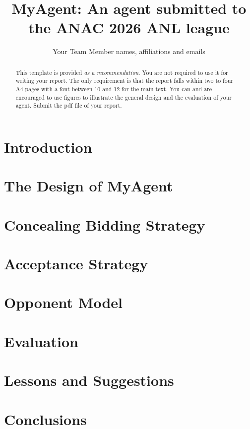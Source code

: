 \documentclass{article}
\title{MyAgent: An agent submitted to the ANAC 2026 ANL league}
\author{Your Team Member names, affiliations and emails}
\begin{document}
\maketitle
\begin{abstract}
	This template is provided \emph{as a recommendation}. You are not required
	to use it for writing your report. The only requirement is that the report
	falls within two to four A4 pages with a font between 10 and 12 for the main
	text. You can and are encouraged to use figures to illustrate the general
	design and the evaluation of your agent. Submit the pdf file of your report.
\end{abstract}
\section{Introduction}
\section{The Design of MyAgent}
\section{Concealing Bidding Strategy}
\section{Acceptance Strategy}
\section{Opponent Model}
\section{Evaluation}
\section{Lessons and Suggestions}
\section*{Conclusions}
\end{document}
